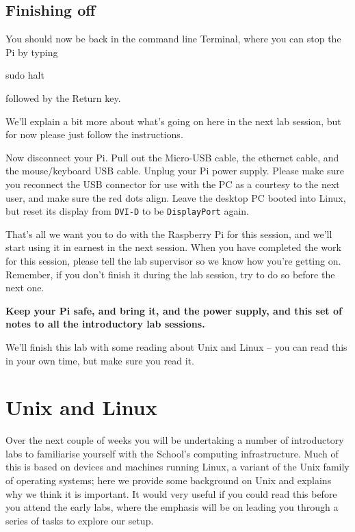 \subsection{Finishing off}

You should now be back in the command line Terminal, where you can stop the Pi by typing

\begin{ttoutenv}
sudo halt
\end{ttoutenv}

followed by the Return key.

\noindent We'll explain a bit more about what's going on here in the
next lab session, but for now please just follow the instructions.


Now disconnect your Pi. Pull out the Micro-USB cable, the ethernet
cable, and the mouse/keyboard USB cable. Unplug your Pi
power supply.  Please make sure you reconnect the USB connector for
use with the PC as a courtesy to the next user, and make sure the red
dots align. Leave the desktop PC booted into Linux, but reset its
display from \verb+DVI-D+ to be \verb+DisplayPort+ again.

That's all we want you to do with the Raspberry Pi for this session,
and we'll start using it in earnest in the next session.  When you
have completed the work for this session, please tell the lab
supervisor so we know how you're getting on. Remember, if you don't
finish it during the lab session, try to do so before the next
one.

\textbf{Keep your Pi safe, and bring it, and the power supply, and
  this set of notes to all the introductory lab sessions.}

We'll finish this lab with some reading about Unix and Linux -- you
can read this in your own time, but make sure you read it.

\section{Unix and Linux}
\label{sec:unix-linux}

Over the next couple of weeks you will be undertaking a number of
introductory labs to familiarise yourself with the School's computing
infrastructure. Much of this is based on devices and machines running Linux, a
variant of the Unix family of operating systems; here we
provide some background on Unix and explains why we think it is
important. It would very useful if you could read this before you
attend the early labs, where the emphasis will be on
leading you through a series of tasks to explore our setup.

